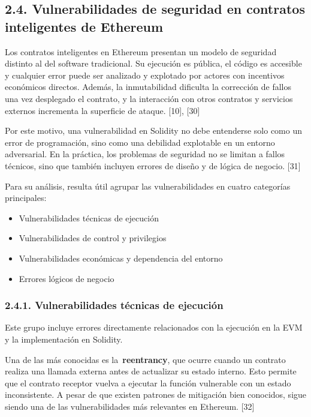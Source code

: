\subsection{2.4. Vulnerabilidades de seguridad en contratos inteligentes
de
Ethereum}\label{vulnerabilidades-de-seguridad-en-contratos-inteligentes-de-ethereum}

Los contratos inteligentes en Ethereum presentan un modelo de seguridad
distinto al del software tradicional. Su ejecución es pública, el código
es accesible y cualquier error puede ser analizado y explotado por
actores con incentivos económicos directos. Además, la inmutabilidad
dificulta la corrección de fallos una vez desplegado el contrato, y la
interacción con otros contratos y servicios externos incrementa la
superficie de ataque. {[}10{]}, {[}30{]}

Por este motivo, una vulnerabilidad en Solidity no debe entenderse solo
como un error de programación, sino como una debilidad explotable en un
entorno adversarial. En la práctica, los problemas de seguridad no se
limitan a fallos técnicos, sino que también incluyen errores de diseño y
de lógica de negocio. {[}31{]}

Para su análisis, resulta útil agrupar las vulnerabilidades en cuatro
categorías principales:

\begin{itemize}
\tightlist
\item
  Vulnerabilidades técnicas de ejecución
\item
  Vulnerabilidades de control y privilegios
\item
  Vulnerabilidades económicas y dependencia del entorno
\item
  Errores lógicos de negocio
\end{itemize}

\subsubsection{2.4.1. Vulnerabilidades técnicas de
ejecución}\label{vulnerabilidades-tuxe9cnicas-de-ejecuciuxf3n}

Este grupo incluye errores directamente relacionados con la ejecución en
la EVM y la implementación en Solidity.

Una de las más conocidas es la~\textbf{reentrancy}, que ocurre cuando un
contrato realiza una llamada externa antes de actualizar su estado
interno. Esto permite que el contrato receptor vuelva a ejecutar la
función vulnerable con un estado inconsistente. A pesar de que existen
patrones de mitigación bien conocidos, sigue siendo una de las
vulnerabilidades más relevantes en Ethereum. {[}32{]}

